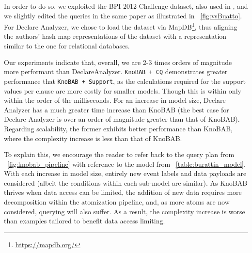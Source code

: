 
In order to do so, we exploited the BPI 2012 Challenge dataset, also used in \cite{BurattinMS16}, and we slightly edited the queries in the same paper as illustrated in \figurename~\ref{fig:vsBuatto}. For Declare Analyzer, we chose to load the dataset via MapDB\footnote{\url{https://mapdb.org/}}, thus aligning the authors' hash map representations of the dataset with a representation similar to the one for relational databases. 

Our experiments indicate that, overall, we are 2-3 times orders of magnitude more performant than DeclareAnalyzer. \texttt{KnoBAB + CQ} demonstrates greater performance that \texttt{KnoBAB + Support}, as the calculations required for the support values per clause are more costly for smaller models. Though this is within only within the order of the milliseconds. For an increase in model size, Declare Analyzer has a much greater time increase than KnoBAB (the best case for Declare Analyzer is over an order of magnitude greater than that of KnoBAB). Regarding scalability, the former exhibits better performance than KnoBAB, where the complexity increase is less than that of KnoBAB. 

To explain this, we encourage the reader to refer back to the query plan from \figurename~\ref{fig:knobab_pipeline} with reference to the model from \tablename~\ref{table:burattin_model}. With each increase in model size, entirely new event labels and data payloads are considered (albeit the conditions within each sub-model are similar). As KnoBAB thrives when data access can be limited, the addition of new data requires more decomposition within the atomization pipeline, and, as more atoms are now considered, querying will also suffer. As a result, the complexity increase is worse than examples tailored to benefit data access limiting.



%
%
%
